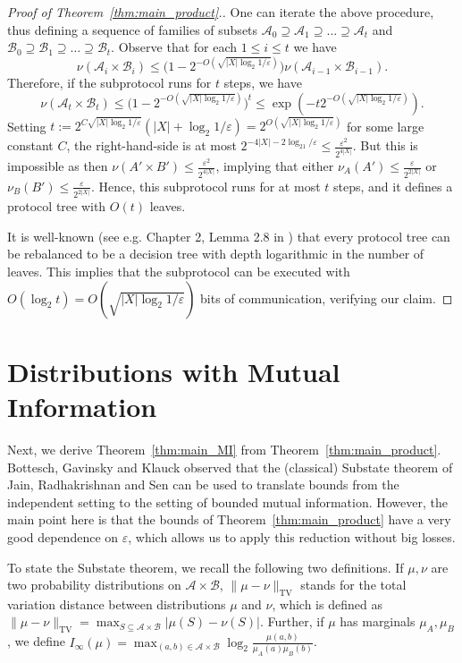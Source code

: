 \documentclass[11pt]{amsart}
\theoremstyle{definition}
\def\eps{\varepsilon}
\def\cA{\mathcal{A}}
\def\cB{\mathcal{B}}
\begin{document}
\begin{proof}[Proof of Theorem~\ref{thm:main_product}.]
One can iterate the above procedure, thus defining a sequence of families of subsets $\cA_0\supseteq \cA_1\supseteq \dots\supseteq \cA_t$ and $\cB_0\supseteq \cB_1\supseteq \dots\supseteq \cB_t$. Observe that for each $1\leq i\leq t$ we have $$\nu(\cA_{i}\times \cB_{i})\leq  \big(1-2^{-O(\sqrt{|X|\log_2 1/\eps})}\big)\nu(\cA_{i-1}\times \cB_{i-1}).$$
Therefore, if the subprotocol runs for $t$ steps, we have
$$\nu(\cA_t\times \cB_t)\leq \big(1-2^{-O(\sqrt{|X|\log_2 1/\eps})}\big)^t\leq \exp(-t2^{-O(\sqrt{|X|\log_2 1/\eps})}).$$
Setting $t:=2^{C \sqrt{|X|\log_2 1/\eps}}(|X|+\log_2 1/\eps)=2^{O(\sqrt{|X|\log_2 1/\eps})}$ for some large constant $C$, the right-hand-side is at most $2^{-4|X|-2\log_21/\eps}\leq \frac{\eps^2}{2^{4|X|}}$. But this is impossible as then $\nu(A'\times B')\leq \frac{\eps^2}{2^{4|X|}}$, implying that either $\nu_{A}(A')\leq \frac{\eps}{2^{2|X|}}$ or $\nu_{B}(B')\leq  \frac{\eps}{2^{2|X|}}$. Hence, this subprotocol runs for at most $t$ steps, and it defines a protocol tree with $O(t)$ leaves.

It is well-known (see e.g. Chapter 2, Lemma 2.8 in \cite{KN}) that every protocol tree can be rebalanced to be a decision tree with depth logarithmic in the number of leaves. This implies that the subprotocol can be executed with $O(\log_2 t)=O(\sqrt{|X|\log_2 1/\eps})$ bits of communication, verifying our claim.
\end{proof}

\section{Distributions with Mutual Information}\label{sec:mutual}

Next, we derive Theorem~\ref{thm:main_MI} from Theorem~\ref{thm:main_product}. Bottesch, Gavinsky and Klauck observed that the (classical) Substate theorem of Jain, Radhakrishnan and Sen \cite{JRS02} can be used to translate bounds from the independent setting to the setting of bounded mutual information. However, the main point here is that the bounds of Theorem~\ref{thm:main_product} have a very good dependence on $\eps$, which allows us to apply this reduction without big losses.

To state the Substate theorem, we recall the following two definitions. If $\mu, \nu$ are two probability distributions on $\cA\times \cB$, $\|\mu-\nu\|_{\operatorname{TV}}$ stands for the total variation distance between distributions $\mu$ and $\nu$, which is defined as $\|\mu-\nu\|_{\operatorname{TV}}=\max_{S\subseteq \cA\times \cB}|\mu(S)-\nu(S)|$. Further, if $\mu$ has marginals $\mu_A, \mu_B$, we define $I_\infty(\mu)=\max_{(a, b)\in \cA\times \cB} \log_2 \frac{\mu(a, b)}{\mu_A(a)\mu_B(b)}$.
\end{document}
